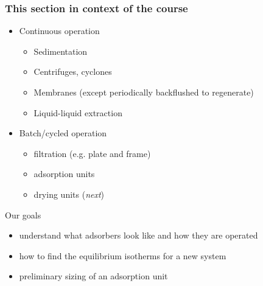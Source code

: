 \begin{frame}\frametitle{This section in context of the course}
	\begin{itemize}
		\item	Continuous operation
		\begin{itemize}
			\item	Sedimentation
			\item	Centrifuges, cyclones
			\item	Membranes (except periodically backflushed to regenerate)
			\item	Liquid-liquid extraction
		\end{itemize}

		\vspace{12pt}
		\item	Batch/cycled operation
		\begin{itemize}
			\item	filtration (e.g. plate and frame)
			\item	{\color{red}adsorption units}
			\item	drying units (\emph{next})
		\end{itemize}
	\end{itemize}

	\vspace{12pt}
	{\color{myOrange}Our goals}
	\begin{itemize}
		\item	understand what adsorbers look like and how they are operated
		\item	how to find the equilibrium isotherms for a new system
		\item	preliminary sizing of an adsorption unit
	\end{itemize}
\end{frame}

